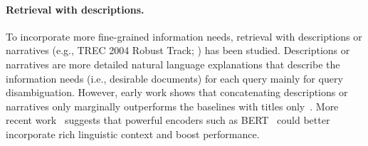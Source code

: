 \paragraph{Retrieval with descriptions.}
{
To incorporate more fine-grained information needs, retrieval with descriptions or narratives (e.g., TREC 2004 Robust Track; \citealt{96071}) has been studied. 
Descriptions or narratives are more detailed natural language explanations that describe the information needs (i.e., desirable documents) for each query mainly for query disambiguation. 
However, early work shows that concatenating descriptions or narratives only marginally outperforms the baselines with titles only~\cite{walker1998okapi,10.1145/3404835.3462812}.
More recent work~\cite{DBLP:conf/sigir/DaiC19,10.1145/3366423.3380258} suggests that powerful encoders such as BERT~\cite{devlin-etal-2019-bert} could better incorporate rich linguistic context and boost performance.  }

